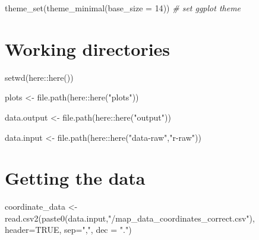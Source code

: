 \documentclass[
]{article}
\newenvironment{Shaded}{\begin{snugshade}}{\end{snugshade}}
\newcommand{\AttributeTok}[1]{\textcolor[rgb]{0.77,0.63,0.00}{#1}}
\newcommand{\CommentTok}[1]{\textcolor[rgb]{0.56,0.35,0.01}{\textit{#1}}}
\newcommand{\ConstantTok}[1]{\textcolor[rgb]{0.00,0.00,0.00}{#1}}
\newcommand{\DecValTok}[1]{\textcolor[rgb]{0.00,0.00,0.81}{#1}}
\newcommand{\FunctionTok}[1]{\textcolor[rgb]{0.00,0.00,0.00}{#1}}
\newcommand{\NormalTok}[1]{#1}
\newcommand{\OtherTok}[1]{\textcolor[rgb]{0.56,0.35,0.01}{#1}}
\newcommand{\SpecialCharTok}[1]{\textcolor[rgb]{0.00,0.00,0.00}{#1}}
\newcommand{\StringTok}[1]{\textcolor[rgb]{0.31,0.60,0.02}{#1}}
\begin{document}
\begin{Shaded}
\begin{Highlighting}[]
\FunctionTok{theme\_set}\NormalTok{(}\FunctionTok{theme\_minimal}\NormalTok{(}\AttributeTok{base\_size =} \DecValTok{14}\NormalTok{)) }\CommentTok{\# set ggplot theme }
\end{Highlighting}
\end{Shaded}

\hypertarget{working-directories}{%
\section{Working directories}\label{working-directories}}

\begin{Shaded}
\begin{Highlighting}[]
\FunctionTok{setwd}\NormalTok{(here}\SpecialCharTok{::}\FunctionTok{here}\NormalTok{())}

\NormalTok{plots }\OtherTok{\textless{}{-}} \FunctionTok{file.path}\NormalTok{(here}\SpecialCharTok{::}\FunctionTok{here}\NormalTok{(}\StringTok{"plots"}\NormalTok{))}

\NormalTok{data.output }\OtherTok{\textless{}{-}} \FunctionTok{file.path}\NormalTok{(here}\SpecialCharTok{::}\FunctionTok{here}\NormalTok{(}\StringTok{"output"}\NormalTok{))}

\NormalTok{data.input }\OtherTok{\textless{}{-}} \FunctionTok{file.path}\NormalTok{(here}\SpecialCharTok{::}\FunctionTok{here}\NormalTok{(}\StringTok{"data{-}raw"}\NormalTok{,}\StringTok{"r{-}raw"}\NormalTok{))}
\end{Highlighting}
\end{Shaded}

\hypertarget{getting-the-data}{%
\section{Getting the data}\label{getting-the-data}}

\begin{Shaded}
\begin{Highlighting}[]
\NormalTok{coordinate\_data }\OtherTok{\textless{}{-}} \FunctionTok{read.csv2}\NormalTok{(}\FunctionTok{paste0}\NormalTok{(data.input,}\StringTok{"/map\_data\_coordinates\_correct.csv"}\NormalTok{), }\AttributeTok{header=}\ConstantTok{TRUE}\NormalTok{, }\AttributeTok{sep=}\StringTok{","}\NormalTok{, }\AttributeTok{dec =} \StringTok{"."}\NormalTok{)}
\end{Highlighting}
\end{Shaded}
\end{document}
